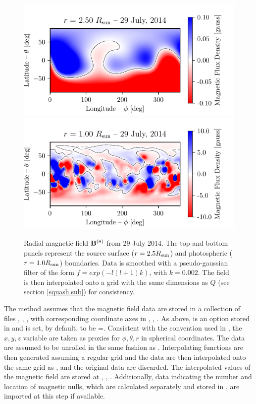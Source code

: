 \documentclass[10pt]{aastex62}
\begin{document}
\begin{itemize}
\begin{figure}[h]
\center
\includegraphics[width=0.45\linewidth]{./fig_src_fls/140729_br_top.pdf}\includegraphics[width=0.45\linewidth]{./fig_src_fls/140729_br_bot.pdf}
\caption{Radial magnetic field ${\bf B}^{(8)}$ from 29 July 2014. The top and bottom panels represent the source surface ($r=2.5 R_{\rm sun}$) and photospheric ($r=1.0 R_{\rm sun}$) boundaries. Data is smoothed with a  pseudo-gaussian filter of the form $f = exp(-l(l+1) k)$, with $k=0.002$. The field is then interpolated onto a grid with the same dimensions as $Q$ (see section \ref{squash.sub}) for consistency. }
\label{source_field.fig}
\end{figure}

The  method assumes that the magnetic field data are stored in a collection of files , , , with corresponding coordinate axes in , , .
As above,  is an option stored in  and is set, by default, to be =.
Consistent with the convention used in , the $x, y, z$ variable are taken as proxies for $\phi, \theta, r$ in spherical coordinates. 
The data are assumed to be unrolled in the same fashion as . 
Interpolating functions are then generated assuming a regular grid and the data are then interpolated onto the same grid as , and the original data are discarded.
The interpolated values of the magnetic field are stored at , , . 
Additionally, data indicating the number and location of magnetic nulls, which are calculated separately and stored in , are imported at this step if available.



\end{itemize}
\end{document}
